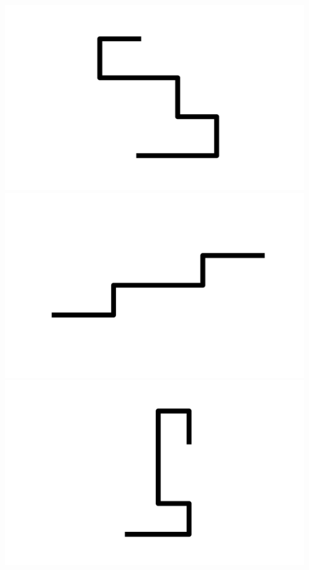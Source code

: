 \documentclass[]{report}
\begin{document}
\includegraphics[scale=.1]{pictures/21/state_cluster_shapes_169.pdf} 
\includegraphics[scale=.1]{pictures/21/state_cluster_shapes_170.pdf} 
\includegraphics[scale=.1]{pictures/21/state_cluster_shapes_171.pdf} 
\end{document}
